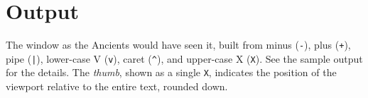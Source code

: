 \section*{Output}

The window as the Ancients would have seen it, built from minus (\verb!-!), plus (\verb!+!), pipe (\verb!|!), lower-case V (\verb!v!), caret (\verb!^!), and upper-case X (\verb!X!).
See the sample output for the details.
The \emph{thumb}, shown as a single \verb!X!, indicates the position of the viewport relative to the entire text, rounded down.
